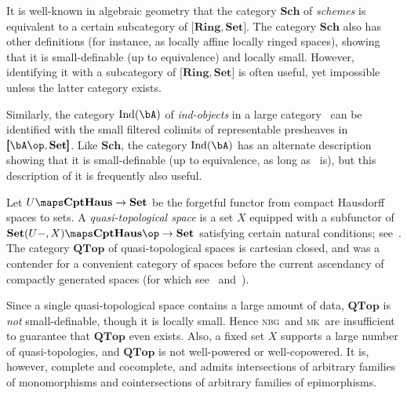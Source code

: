 \documentclass[12pt]{amsart}
\newcommand{\Set}{\ensuremath{\mathbf{Set}}}
\def\nbg{\textsc{nbg}}
\def\mk{\textsc{mk}}
\begin{document}

\begin{eg}
  It is well-known in algebraic geometry that the category
  $\mathbf{Sch}$ of \emph{schemes} is equivalent to a certain
  subcategory of $\pmb[\mathbf{Ring},\Set\pmb]$.  The category
  $\mathbf{Sch}$ also has other definitions (for instance, as locally
  affine locally ringed spaces), showing that it is small-definable
  (up to equivalence) and locally small.  However, identifying it with
  a subcategory of $\pmb[\mathbf{Ring},\Set\pmb]$ is often useful, yet
  impossible unless the latter category exists.
\end{eg}

\begin{eg}
  Similarly, the category $\operatorname{Ind}(\bA)$ of
  \emph{ind-objects} in a large category \bA\ can be identified with
  the small filtered colimits of representable presheaves in
  $\pmb[\bA\op,\Set\pmb]$.  Like $\mathbf{Sch}$, the category
  $\operatorname{Ind}(\bA)$ has an alternate description showing that
  it is small-definable (up to equivalence, as long as \bA\ is), but
  this description of it is frequently also useful.
\end{eg}


\begin{eg}
  Let $U\maps \mathbf{CptHaus}\to\Set$ be the forgetful functor from
  compact Hausdorff spaces to sets.  A \emph{quasi-topological space}
  is a set $X$ equipped with a subfunctor of $\Set(U-,X)\maps
  \mathbf{CptHaus}\op\to\Set$ satisfying certain natural conditions;
  see~\cite{quasi-topologies}.  The category $\mathbf{QTop}$ of
  quasi-topological spaces is cartesian closed, and was a
  contender for a convenient category of spaces before the current
  ascendancy of compactly generated spaces (for which
  see~\cite[VII.8]{maclane} and~\cite[Ch.~5]{may:concise}).

  Since a single quasi-topological space contains a large amount of
  data, $\mathbf{QTop}$ is \emph{not} small-definable, though it is
  locally small.  Hence \nbg\ and \mk\ are insufficient to guarantee
  that $\mathbf{QTop}$ even exists.  Also, a fixed set $X$ supports a
  large number of quasi-topologies, and $\mathbf{QTop}$ is not
  well-powered or well-copowered.  It is, however, complete and
  cocomplete, and admits intersections of arbitrary families of
  monomorphisms and cointersections of arbitrary families of
  epimorphisms.
\end{eg}
\end{document}
